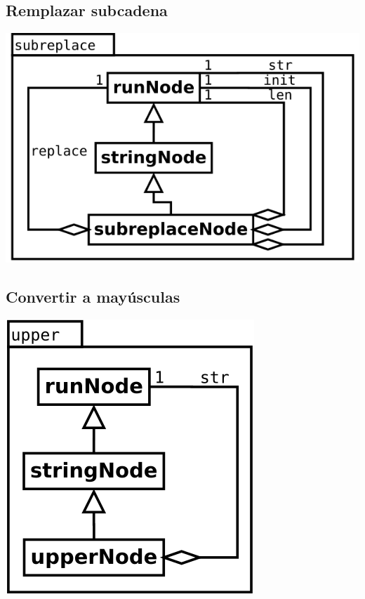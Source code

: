 \subsection {Remplazar subcadena}
\begin{center}
\includegraphics[scale=0.4]{subreplace.png} \\
\end{center}

\subsection {Convertir a mayúsculas}
\begin{center}
\includegraphics[scale=0.4]{upper.png} \\
\end{center}

